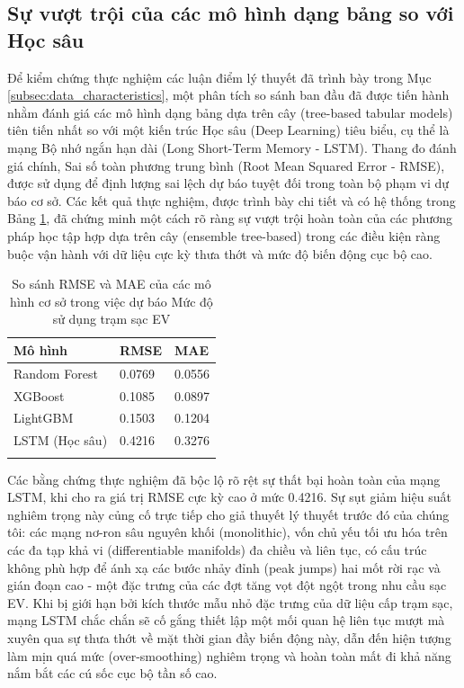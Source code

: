 \documentclass[pdflatex,sn-mathphys-num]{sn-jnl}%
\theoremstyle{thmstyleone}%
\theoremstyle{thmstyletwo}%
\theoremstyle{thmstylethree}%
\begin{document}
\subsection{Sự vượt trội của các mô hình dạng bảng so với Học sâu}\label{subsec3_1}
Để kiểm chứng thực nghiệm các luận điểm lý thuyết đã trình bày trong Mục \ref{subsec:data_characteristics}, một phân tích so sánh ban đầu đã được tiến hành nhằm đánh giá các mô hình dạng bảng dựa trên cây (tree-based tabular models) tiên tiến nhất so với một kiến trúc Học sâu (Deep Learning) tiêu biểu, cụ thể là mạng Bộ nhớ ngắn hạn dài (Long Short-Term Memory - LSTM). Thang đo đánh giá chính, Sai số toàn phương trung bình (Root Mean Squared Error - RMSE), được sử dụng để định lượng sai lệch dự báo tuyệt đối trong toàn bộ phạm vi dự báo cơ sở. Các kết quả thực nghiệm, được trình bày chi tiết và có hệ thống trong Bảng \ref{tab:rmse_comparison}, đã chứng minh một cách rõ ràng sự vượt trội hoàn toàn của các phương pháp học tập hợp dựa trên cây (ensemble tree-based) trong các điều kiện ràng buộc vận hành với dữ liệu cực kỳ thưa thớt và mức độ biến động cục bộ cao.

\begin{table}[h]
\caption{So sánh RMSE và MAE của các mô hình cơ sở trong việc dự báo Mức độ sử dụng trạm sạc EV}\label{tab:rmse_comparison}
\begin{tabular}{@{}lll@{}}
\toprule
Mô hình & RMSE & MAE \\
\midrule
Random Forest & 0.0769 & 0.0556 \\
XGBoost & 0.1085 & 0.0897 \\
LightGBM & 0.1503 & 0.1204 \\
LSTM (Học sâu) & 0.4216 & 0.3276 \\
\botrule
\end{tabular}
\end{table}

Các bằng chứng thực nghiệm đã bộc lộ rõ rệt sự thất bại hoàn toàn của mạng LSTM, khi cho ra giá trị RMSE cực kỳ cao ở mức 0.4216. Sự sụt giảm hiệu suất nghiêm trọng này củng cố trực tiếp cho giả thuyết lý thuyết trước đó của chúng tôi: các mạng nơ-ron sâu nguyên khối (monolithic), vốn chủ yếu tối ưu hóa trên các đa tạp khả vi (differentiable manifolds) đa chiều và liên tục, có cấu trúc không phù hợp để ánh xạ các bước nhảy đỉnh (peak jumps) hai mốt rời rạc và gián đoạn cao - một đặc trưng của các đợt tăng vọt đột ngột trong nhu cầu sạc EV. Khi bị giới hạn bởi kích thước mẫu nhỏ đặc trưng của dữ liệu cấp trạm sạc, mạng LSTM chắc chắn sẽ cố gắng thiết lập một mối quan hệ liên tục mượt mà xuyên qua sự thưa thớt về mặt thời gian đầy biến động này, dẫn đến hiện tượng làm mịn quá mức (over-smoothing) nghiêm trọng và hoàn toàn mất đi khả năng nắm bắt các cú sốc cục bộ tần số cao.
\end{document}
